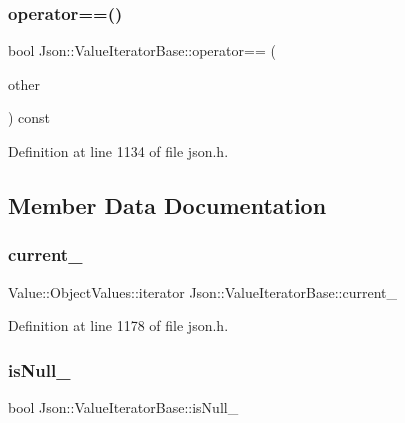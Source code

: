 \subsubsection{\texorpdfstring{operator==()}{operator==()}\hspace{0.1cm}{\footnotesize\ttfamily [2/2]}}
{\footnotesize\ttfamily bool Json\+::\+Value\+Iterator\+Base\+::operator== (\begin{DoxyParamCaption}\item[{const \hyperlink{class_json_1_1_value_iterator_base_a9d2a940d03ea06d20d972f41a89149ee}{Self\+Type} \&}]{other }\end{DoxyParamCaption}) const\hspace{0.3cm}{\ttfamily [inline]}}



Definition at line 1134 of file json.\+h.



\subsection{Member Data Documentation}
\hypertarget{class_json_1_1_value_iterator_base_ab3138ce8af8301cca3b041ea55cb922a}{}\label{class_json_1_1_value_iterator_base_ab3138ce8af8301cca3b041ea55cb922a} 
\subsubsection{\texorpdfstring{current\+\_\+}{current\_}}
{\footnotesize\ttfamily Value\+::\+Object\+Values\+::iterator Json\+::\+Value\+Iterator\+Base\+::current\+\_\+\hspace{0.3cm}{\ttfamily [private]}}



Definition at line 1178 of file json.\+h.

\hypertarget{class_json_1_1_value_iterator_base_a3e08b114a1aed9bde518c527f94a8c59}{}\label{class_json_1_1_value_iterator_base_a3e08b114a1aed9bde518c527f94a8c59} 
\subsubsection{\texorpdfstring{is\+Null\+\_\+}{isNull\_}}
{\footnotesize\ttfamily bool Json\+::\+Value\+Iterator\+Base\+::is\+Null\+\_\+\hspace{0.3cm}{\ttfamily [private]}}



